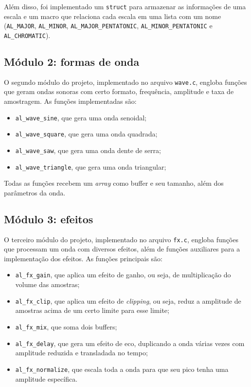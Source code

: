 \documentclass{article}
\begin{document}
Além disso, foi implementado um \texttt{struct} para armazenar as informações de uma escala e um macro que relaciona cada escala em uma lista com um nome (\texttt{AL\_MAJOR}, \texttt{AL\_MINOR}, \texttt{AL\_MAJOR\_PENTATONIC}, \texttt{AL\_MINOR\_PENTATONIC} e \texttt{AL\_CHROMATIC}).

\subsection{Módulo 2: formas de onda}
O segundo módulo do projeto, implementado no arquivo \texttt{wave.c}, engloba funções que geram ondas sonoras com certo formato, frequência, amplitude e taxa de amostragem. As funções implementadas são:
\begin{itemize}
    \item \texttt{al\_wave\_sine}, que gera uma onda senoidal;
    \item \texttt{al\_wave\_square}, que gera uma onda quadrada;
    \item \texttt{al\_wave\_saw}, que gera uma onda dente de serra;
    \item \texttt{al\_wave\_triangle}, que gera uma onda triangular;
\end{itemize}

Todas as funções recebem um \textit{array} como buffer e seu tamanho, além dos parâmetros da onda.

\subsection{Módulo 3: efeitos}
O terceiro módulo do projeto, implementado no arquivo \texttt{fx.c}, engloba funções que processam um onda com diversos efeitos, além de funções auxiliares para a implementação dos efeitos. As funções principais são:
\begin{itemize}
    \item \texttt{al\_fx\_gain}, que aplica um efeito de ganho, ou seja, de multiplicação do volume das amostras;
    \item \texttt{al\_fx\_clip}, que aplica um efeito de \textit{clipping}, ou seja, reduz a amplitude de amostras acima de um certo limite para esse limite;
    \item \texttt{al\_fx\_mix}, que soma dois buffers;
    \item \texttt{al\_fx\_delay}, que gera um efeito de eco, duplicando a onda várias vezes com amplitude reduzida e transladada no tempo;
    \item \texttt{al\_fx\_normalize}, que escala toda a onda para que seu pico tenha uma amplitude específica.
\end{itemize}
\end{document}
